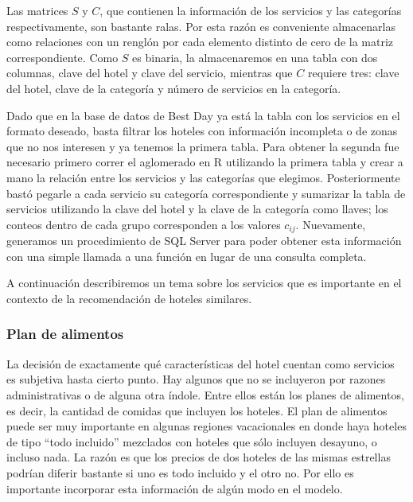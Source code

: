 \documentclass[12pt]{report}
\begin{document}
Las matrices $S$ y $C$, que contienen la información de los servicios y las categorías respectivamente, son bastante ralas. Por esta razón es conveniente almacenarlas como relaciones con un renglón por cada elemento distinto de cero de la matriz correspondiente. Como $S$ es binaria, la almacenaremos en una tabla con dos columnas, clave del hotel y clave del servicio, mientras que $C$ requiere tres: clave del hotel, clave de la categoría y número de servicios en la categoría.

Dado que en la base de datos de Best Day ya está la tabla con los servicios en el formato deseado, basta filtrar los hoteles con información incompleta o de zonas que no nos interesen y ya tenemos la primera tabla. Para obtener la segunda fue necesario primero correr el aglomerado en R utilizando la primera tabla y crear a mano la relación entre los servicios y las categorías que elegimos. Posteriormente bastó pegarle a cada servicio su categoría correspondiente y sumarizar la tabla de servicios utilizando la clave del hotel y la clave de la categoría como llaves; los conteos dentro de cada grupo corresponden a los valores $c_{ij}$. Nuevamente, generamos un procedimiento de SQL Server para poder obtener esta información con una simple llamada a una función en lugar de una consulta completa.

A continuación describiremos un tema sobre los servicios que es importante en el contexto de la recomendación de hoteles similares.

\subsubsection*{Plan de alimentos}

La decisión de exactamente qué características del hotel cuentan como servicios es subjetiva hasta cierto punto. Hay algunos que no se incluyeron por razones administrativas o de alguna otra índole. Entre ellos están los planes de alimentos, es decir, la cantidad de comidas que incluyen los hoteles. El plan de alimentos puede ser muy importante en algunas regiones vacacionales en donde haya hoteles de tipo ``todo incluido'' mezclados con hoteles que sólo incluyen desayuno, o incluso nada. La razón es que los precios de dos hoteles de las mismas estrellas podrían diferir bastante si uno es todo incluido y el otro no. Por ello es importante incorporar esta información de algún modo en el modelo.
\end{document}

